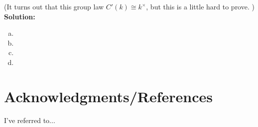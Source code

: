 \documentclass[12pt]{article}
\begin{document}
\noindent (It turns out that this group law $C'(k) \cong k^\times$, but this is a little hard to prove. )\\



\noindent \textbf{Solution:}

\begin{enumerate}[(a)]
	\item 
	\item 
	\item 
	\item 
\end{enumerate}


\newpage



\section*{Acknowledgments/References}

I've referred to...




	
\end{document}
